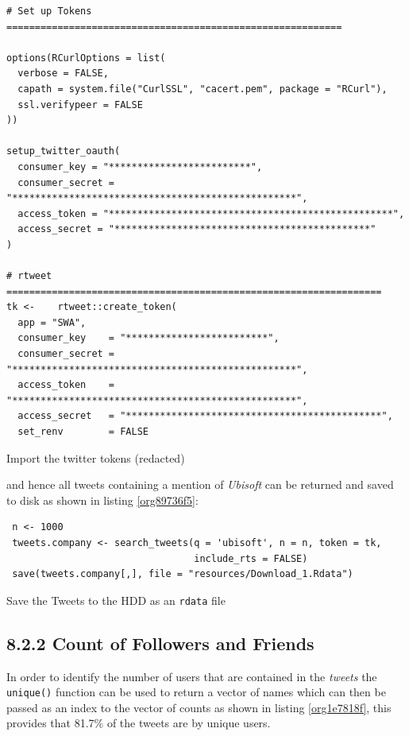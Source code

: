 \documentclass[11pt]{article}
\begin{document}
\begin{listing}[htbp]
\begin{verbatim}
# Set up Tokens ===========================================================

options(RCurlOptions = list(
  verbose = FALSE,
  capath = system.file("CurlSSL", "cacert.pem", package = "RCurl"),
  ssl.verifypeer = FALSE
))

setup_twitter_oauth(
  consumer_key = "*************************",
  consumer_secret = "**************************************************",
  access_token = "**************************************************",
  access_secret = "*********************************************"
)

# rtweet ==================================================================
tk <-    rtweet::create_token(
  app = "SWA",
  consumer_key    = "*************************",
  consumer_secret = "**************************************************",
  access_token    = "**************************************************",
  access_secret   = "*********************************************",
  set_renv        = FALSE
\end{verbatim}
\caption{\label{org5c50f40}Import the twitter tokens (redacted)}
\end{listing}

and hence all tweets containing a mention of \emph{Ubisoft} can be returned and saved to disk as shown in listing \ref{org89736f5}:

\begin{listing}[htbp]
\begin{verbatim}
 n <- 1000
 tweets.company <- search_tweets(q = 'ubisoft', n = n, token = tk,
                                 include_rts = FALSE)
 save(tweets.company[,], file = "resources/Download_1.Rdata")
\end{verbatim}
\caption{\label{org89736f5}Save the Tweets to the HDD as an \texttt{rdata} file}
\end{listing}

\subsection{8.2.2 Count of Followers and Friends}
\label{sec:org85340c7}
In order to identify the number of users that are contained in the \emph{tweets} the
\texttt{unique()} function can be used to return a vector of names which can then be passed as an index to the vector of counts as shown in listing \ref{org1e7818f}, this provides that 81.7\% of the tweets are by unique users.
\end{document}

